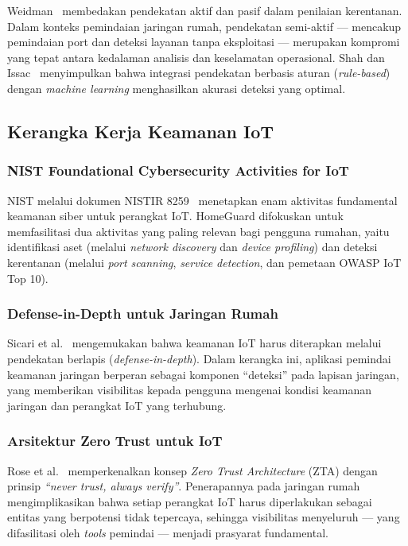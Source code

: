 \documentclass[conference]{IEEEtran}
\begin{document}
Weidman\ \cite{weidman2014} membedakan pendekatan aktif dan pasif dalam penilaian kerentanan. Dalam konteks pemindaian jaringan rumah, pendekatan semi-aktif --- mencakup pemindaian port dan deteksi layanan tanpa eksploitasi --- merupakan kompromi yang tepat antara kedalaman analisis dan keselamatan operasional. Shah dan Issac\ \cite{shah2018} menyimpulkan bahwa integrasi pendekatan berbasis aturan (\textit{rule-based}) dengan \textit{machine learning} menghasilkan akurasi deteksi yang optimal.

\subsection{Kerangka Kerja Keamanan IoT}

\subsubsection{NIST Foundational Cybersecurity Activities for IoT}

NIST melalui dokumen NISTIR 8259\ \cite{nist2020} menetapkan enam aktivitas fundamental keamanan siber untuk perangkat IoT. HomeGuard difokuskan untuk memfasilitasi dua aktivitas yang paling relevan bagi pengguna rumahan, yaitu identifikasi aset (melalui \textit{network discovery} dan \textit{device profiling}) dan deteksi kerentanan (melalui \textit{port scanning}, \textit{service detection}, dan pemetaan OWASP IoT Top 10).

\subsubsection{Defense-in-Depth untuk Jaringan Rumah}

Sicari et al.\ \cite{sicari2015} mengemukakan bahwa keamanan IoT harus diterapkan melalui pendekatan berlapis (\textit{defense-in-depth}). Dalam kerangka ini, aplikasi pemindai keamanan jaringan berperan sebagai komponen ``deteksi'' pada lapisan jaringan, yang memberikan visibilitas kepada pengguna mengenai kondisi keamanan jaringan dan perangkat IoT yang terhubung.

\subsubsection{Arsitektur Zero Trust untuk IoT}

Rose et al.\ \cite{rose2020} memperkenalkan konsep \textit{Zero Trust Architecture} (ZTA) dengan prinsip \textit{``never trust, always verify''}. Penerapannya pada jaringan rumah mengimplikasikan bahwa setiap perangkat IoT harus diperlakukan sebagai entitas yang berpotensi tidak tepercaya, sehingga visibilitas menyeluruh --- yang difasilitasi oleh \textit{tools} pemindai --- menjadi prasyarat fundamental.
\end{document}
